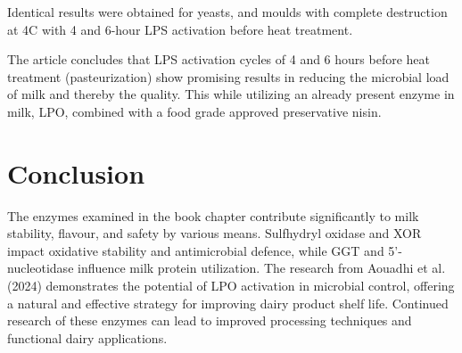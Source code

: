 \vline

Identical results were obtained for yeasts, and moulds with complete destruction at 4\textdegree C with 4 and 6-hour LPS activation before heat treatment. 

\vline

The article concludes that LPS activation cycles of 4 and 6 hours before heat treatment (pasteurization) show promising results in reducing the microbial load of milk and thereby the quality. This while utilizing an already present enzyme in milk, LPO, combined with a food grade approved preservative nisin.

\section{Conclusion}

The enzymes examined in the book chapter contribute significantly to milk stability, flavour, and safety by various means. Sulfhydryl oxidase and XOR impact oxidative stability and antimicrobial defence, while GGT and 5'-nucleotidase influence milk protein utilization. The research from Aouadhi et al. (2024) demonstrates the potential of LPO activation in microbial control, offering a natural and effective strategy for improving dairy product shelf life. Continued research of these enzymes can lead to improved processing techniques and functional dairy applications. 


